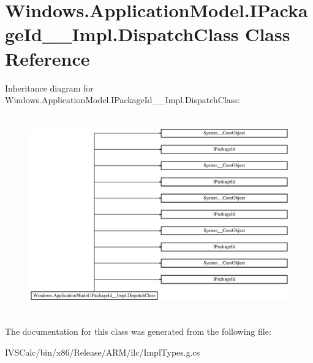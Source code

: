 \hypertarget{class_windows_1_1_application_model_1_1_i_package_id_____impl_1_1_dispatch_class}{}\section{Windows.\+Application\+Model.\+I\+Package\+Id\+\_\+\+\_\+\+Impl.\+Dispatch\+Class Class Reference}
\label{class_windows_1_1_application_model_1_1_i_package_id_____impl_1_1_dispatch_class}
Inheritance diagram for Windows.\+Application\+Model.\+I\+Package\+Id\+\_\+\+\_\+\+Impl.\+Dispatch\+Class\+:\begin{figure}[H]
\begin{center}
\leavevmode
\includegraphics[height=8.603352cm]{class_windows_1_1_application_model_1_1_i_package_id_____impl_1_1_dispatch_class}
\end{center}
\end{figure}


The documentation for this class was generated from the following file\+:\begin{DoxyCompactItemize}
\item 
I\+V\+S\+Calc/bin/x86/\+Release/\+A\+R\+M/ilc/Impl\+Types.\+g.\+cs\end{DoxyCompactItemize}
